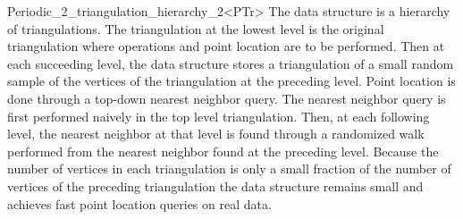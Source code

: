 \begin{ccRefClass}{Periodic_2_triangulation_hierarchy_2<PTr>}
\ccImplementation
The data structure is a hierarchy of triangulations. The triangulation
at the lowest level is the original triangulation where operations and
point location are to be performed.
Then at each succeeding level, the data structure
stores a triangulation of a small random sample of the vertices
of the triangulation at the preceding level. Point location
is done through a top-down nearest neighbor query.
The nearest neighbor query is first
performed naively in the top level triangulation.
Then, at each following level, the nearest neighbor at that level
is found through a randomized walk performed from
the nearest neighbor found at the preceding level.
Because the number of vertices in each triangulation is only a small
fraction of the number of vertices of the preceding triangulation 
the data structure remains small and achieves fast point location 
queries on real data.

\ccSeeAlso
{}\\

\end{ccRefClass}
